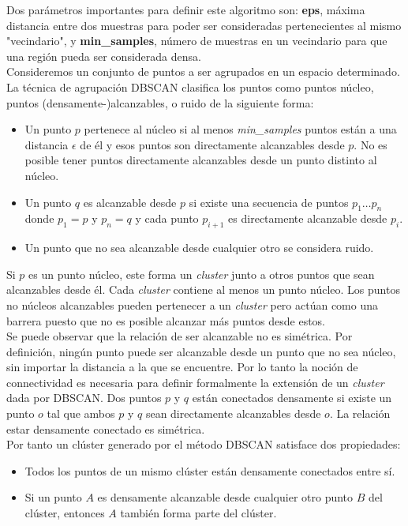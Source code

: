 \documentclass[a4paper, 20pt]{article}
\begin{document}
Dos parámetros importantes para definir este algoritmo son: \textbf{eps}, máxima distancia entre dos muestras para poder ser consideradas pertenecientes al mismo "vecindario", y \textbf{min\_samples}, número de muestras en un vecindario para que una región pueda ser considerada densa.\\

Consideremos un conjunto de puntos a ser agrupados en un espacio determinado. La técnica de agrupación DBSCAN clasifica los puntos como puntos núcleo, puntos (densamente-)alcanzables, o ruido de la siguiente forma:

\begin{itemize}
\item Un punto $p$ pertenece al núcleo si al menos \textit{min\_samples} puntos están a una distancia $\epsilon$ de él y esos puntos son directamente alcanzables desde $p$. No es posible tener puntos directamente alcanzables desde un punto distinto al núcleo.
\item Un punto $q$ es alcanzable desde $p$ si existe una secuencia de puntos $p_1\dots p_n$ donde $p_1=p$ y $p_n=q$ y cada punto $p_{i+1}$ es directamente alcanzable desde $p_i$.
\item Un punto que no sea alcanzable desde cualquier otro se considera ruido.
\end{itemize}

Si $p$ es un punto núcleo, este forma un \textit{cluster} junto a otros puntos que sean alcanzables desde él. Cada \textit{cluster} contiene al menos un punto núcleo. Los puntos no núcleos alcanzables pueden pertenecer a un \textit{cluster} pero actúan como una barrera puesto que no es posible alcanzar más puntos desde estos.\\

Se puede observar que la relación de ser alcanzable no es simétrica. Por definición, ningún punto puede ser alcanzable desde un punto que no sea núcleo, sin importar la distancia a la que se encuentre. Por lo tanto la noción de connectividad es necesaria para definir formalmente la extensión de un \textit{cluster} dada por DBSCAN. Dos puntos $p$ y $q$ están conectados densamente si existe un punto $o$ tal que ambos $p$ y $q$ sean directamente alcanzables desde $o$. La relación estar densamente conectado es simétrica.\\

Por tanto un clúster generado por el método DBSCAN satisface dos propiedades:

\begin{itemize}
\item Todos los puntos de un mismo clúster están densamente conectados entre sí.
\item Si un punto $A$ es densamente alcanzable desde cualquier otro punto $B$ del clúster, entonces $A$ también forma parte del clúster.
\end{itemize}
\end{document}
